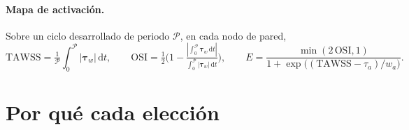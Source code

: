 \documentclass[11pt,a4paper]{article}
\newcommand{\dd}{\,\mathrm{d}}
\begin{document}
\paragraph{Mapa de activación.} Sobre un ciclo desarrollado de periodo $\mathcal P$, en cada nodo de pared,
\begin{equation}
\mathrm{TAWSS}=\tfrac1{\mathcal P}\!\int_0^{\mathcal P}\!|\bm\tau_w|\dd t,\qquad
\mathrm{OSI}=\tfrac12\Big(1-\tfrac{|\int_0^{\mathcal P}\bm\tau_w\dd t|}{\int_0^{\mathcal P}|\bm\tau_w|\dd t}\Big),\qquad
E=\frac{\min(2\,\mathrm{OSI},1)}{1+\exp\big((\mathrm{TAWSS}-\tau_a)/w_a\big)} .
\label{eq:E}
\end{equation}

\section{Por qué cada elección}
\end{document}
